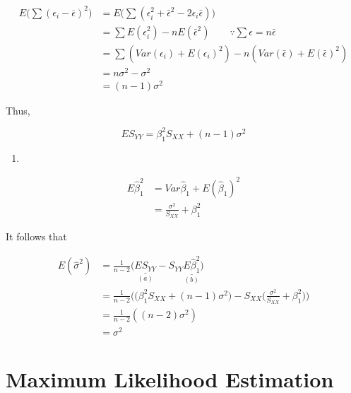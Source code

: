 \documentclass[]{book}
\theoremstyle{definition}
\theoremstyle{definition}
\theoremstyle{definition}
\theoremstyle{remark}
\begin{document}
\begin{equation*}
  \begin{split}
    E\Big( \sum (\epsilon_i - \overline{\epsilon})^2 \Big) & = E \Big( \sum (\epsilon_i^2 + \bar\epsilon^2 - 2\epsilon_i \bar\epsilon) \Big) \\
    & = \sum E(\epsilon_i^2) - n E(\bar\epsilon^2) \qquad \because \sum \epsilon = n \bar\epsilon \\
    & = \sum (Var(\epsilon_i) + E(\epsilon_i)^2) - n(Var(\bar\epsilon) + E(\bar\epsilon)^2) \\
    & = n\sigma^2 - \sigma^2 \\
    & = (n - 1)\sigma^2
  \end{split}
\end{equation*}

Thus,

\[ES_{YY} = \beta_1^2 S_{XX} + (n - 1)\sigma^2\]

\begin{enumerate}
\def\labelenumi{(\alph{enumi})}
\setcounter{enumi}{1}
\item
\end{enumerate}

\begin{equation*}
  \begin{split}
    E\hat\beta_1^2 & = Var\hat\beta_1 + E(\hat\beta_1)^2 \\
    & = \frac{\sigma^2}{S_{XX}} + \beta_1^2
  \end{split}
\end{equation*}

It follows that

\begin{equation*}
  \begin{split}
    E(\hat\sigma^2) & = \frac{1}{n - 2} \Big(  \underset{(a)}{\underline{ES_{YY}}} - S_{YY} \underset{(b)}{\underline{E\hat\beta_1^2}} \Big) \\
    & = \frac{1}{n - 2} \bigg( \Big(\beta_1^2 S_{XX} + (n - 1)\sigma^2 \Big) - S_{XX}\Big(\frac{\sigma^2}{S_{XX}} + \beta_1^2 \Big) \bigg) \\
    & = \frac{1}{n - 2}((n - 2)\sigma^2) \\
    & = \sigma^2
  \end{split}
\end{equation*}

\hypertarget{maximum-likelihood-estimation}{%
\section{Maximum Likelihood Estimation}\label{maximum-likelihood-estimation}}
\end{document}
